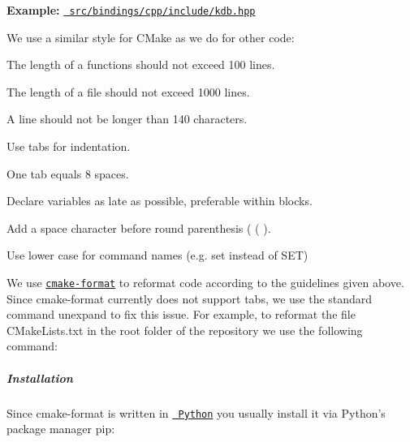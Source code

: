 {\bfseries{Example\+:}} \href{/home/mpranj/workspace/libelektra/src/bindings/cpp/include/kdb.hpp}{\texttt{ src/bindings/cpp/include/kdb.\+hpp}}

We use a similar style for C\+Make as we do for other code\+:


\begin{DoxyItemize}
\item The length of a functions should not exceed 100 lines.
\item The length of a file should not exceed 1000 lines.
\item A line should not be longer than 140 characters.
\item Use tabs for indentation.
\item One tab equals 8 spaces.
\item Declare variables as late as possible, preferable within blocks.
\item Add a space character before round parenthesis ( {\ttfamily (} ).
\item Use lower case for command names (e.\+g. {\ttfamily set} instead of {\ttfamily S\+ET})
\end{DoxyItemize}

We use \href{https://github.com/cheshirekow/cmake_format}{\texttt{ {\ttfamily cmake-\/format}}} to reformat code according to the guidelines given above. Since {\ttfamily cmake-\/format} currently does not support tabs, we use the standard command {\ttfamily unexpand} to fix this issue. For example, to reformat the file {\ttfamily C\+Make\+Lists.\+txt} in the root folder of the repository we use the following command\+:


\begin{DoxyCode}{0}
\end{DoxyCode}


\label{doc_CODING_md_autotoc_md990}%
%
\subparagraph*{Installation}

Since {\ttfamily cmake-\/format} is written in \href{https://www.python.org}{\texttt{ Python}} you usually install it via Python’s package manager {\ttfamily pip}\+:


\begin{DoxyCode}{0}
\end{DoxyCode}


